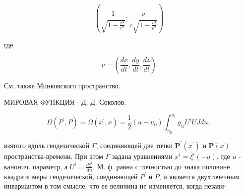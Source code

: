 \documentclass[10pt]{article}
\begin{document}
\[

\left(\frac{1}{\sqrt{1-\frac{v^{2}}{c^{2}}}} ; \frac{v}{c \sqrt{1-\frac{v^{2}}{c^{2}}}}\right)

\]



где



\[

v=\left(\frac{d x}{d t}, \frac{d y}{d t}, \frac{d z}{d t}\right)

\]



См. также Минковского пространство.



МИРОВАЯ ФУНКЦИЯ - Д. Д. Соколов.



\[

\Omega\left(P^{\prime}, P\right)=\Omega\left(x^{\prime}, x\right)=\frac{1}{2}\left(u-u_{0}\right) \int_{u_{0}}^{u_{1}} g_{i j} U^{i} U J d u,

\]



взятого вдоль геодезической $\Gamma$, соединяющей две точки $\boldsymbol{P}^{\prime}\left(x^{\prime}\right)$ и $\boldsymbol{P}(x)$ пространства-времени. При этом $\Gamma$ задана уравнениями $x^{i}=\xi^{i}(-u)$, где $u$ - канонич. параметр, а $U^{i}=\frac{d \xi^{i}}{d u}$. М. ф. равна с точностью до знака половине квадрата меры геодезической, соединяющей $P^{\prime}$ и $P$, и является двухточечным инвариантом в том смысле, что ее величина не изменяется, когда незави-
\end{document}
